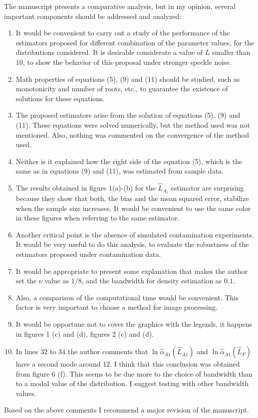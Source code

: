 \documentclass[journal,onecolumn,12pt]{IEEEtran}
\begin{document}
The manuscript presents a comparative analysis, but in my opinion, several important components should be addressed and analyzed:
\begin{enumerate}
	\item It would be convenient  to carry out a study of the performance of the estimators proposed for different combination of the parameter values, for the distributions considered. It is desirable considerate a value of $L$ smaller than $10$, to show the behavior of this proposal under stronger speckle noise.
	\item Math properties of equations (5), (9) and (11) should be studied, such as monotonicity and number of roots, etc., to guarantee the existence of solutions for these equations. 
	\item The proposed estimators arise from the solution of equations (5), (9) and (11). These equations were solved numerically, but the method used was not mentioned. Also, nothing was commented on the convergence of the method used.
	\item Neither is it explained how the right side of the equation (5), which is the same as in equations (9) and (11), was estimated from sample data.
	\item The results obtained in figure 1(a)-(b) for the $\hat{L}_{A_1}$ estimator are surprising because they show that both, the bias and the mean squared error, stabilize when the sample size increases. It would be convenient to use the same color in these figures when referring to the same estimator. 
	\item Another critical point is the absence of simulated contamination experiments. It would be very useful to do this analysis, to evaluate the robustness of the estimators proposed under contamination data.
	\item It would be appropriate to present some explanation that makes the author set the $\nu$ value as $1/8$, and the bandwidth for density estimation as $0.1$. 
	\item Also, a comparison of  the computational time would be convenient. This factor is very important to choose a method for image processing.
	\item It would be opportune not to cover the graphics with the legends, it happens in figures 1 (c) and (d), figures 2 (c) and (d).
	\item In lines $32$ to $34$ the author comments that ${\ln} \hat{\alpha}_{A1}(\hat{L}_{A1})$ and ${\ln} \hat{\alpha}_{A1}(\hat{L}_{F})$ have a second mode around $12$. I think that this conclusion was obtained from figure 6 (f). This seems to be due more to the choice of bandwidth than to a modal value of the distribution. I suggest testing with other bandwidth values.
\end{enumerate}

\vspace{0.5cm}
Based on the above comments I recommend a major revision of the manuscript.
\end{document}
